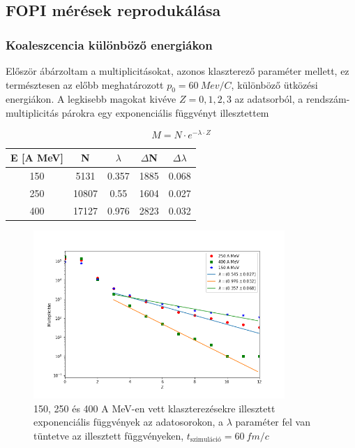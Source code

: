 \documentclass[a4paper,12pt]{article}
\begin{document}
\subsection{ FOPI mérések reprodukálása}

\subsubsection{ Koaleszcencia különböző energiákon}

\par Először ábárzoltam a multiplicitásokat, azonos klaszterező paraméter mellett, ez természtesen az előbb meghatározott $p_{0} = 60 ~Mev/C$, különböző ütközési energiákon. A legkisebb magokat kivéve $Z = 0, 1, 2, 3$ az adatsorból, a rendszám-multiplicitás párokra egy exponenciális függvényt illesztettem

\begin{equation*}
M = N\cdot e^{-\lambda\cdot Z}
\end{equation*}

\vspace{5mm}

\begin{center}
\begin{tabular}{|c|c|c|c|c|}
\hline
E [A MeV] & N & $\lambda$ & $\Delta$N & $\Delta\lambda$ \\
\hline
150 & 5131 & 0.357 & 1885 & 0.068 \\
\hline
250 & 10807 & 0.55 & 1604 & 0.027 \\
\hline
400 & 17127 & 0.976 & 2823 & 0.032 \\
\hline
\end{tabular}
\end{center}

\vspace{3mm}

\begin{figure}[!htb]
\centering
\includegraphics[width=0.85\textwidth]{./p006_250_400_fit.png}
\caption{150, 250 és 400 A MeV-en vett klaszterezésekre illesztett exponenciális függvények az adatosorokon, a $\lambda$ paraméter fel van tüntetve az illesztett függvényeken, $t_{\text{szimuláció}} = 60 ~fm/c$}
\end{figure}
\end{document}
